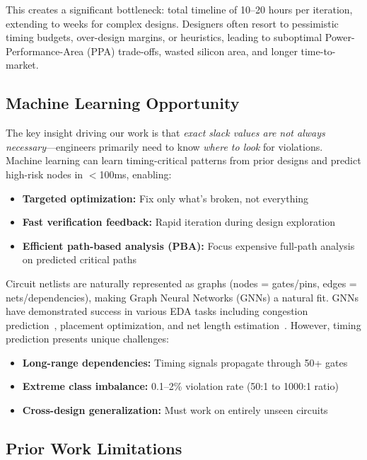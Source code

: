 \documentclass[10pt,twocolumn,journal]{IEEEtran}
\begin{document}
This creates a significant bottleneck: total timeline of 10--20 hours per iteration, extending to weeks for complex designs. Designers often resort to pessimistic timing budgets, over-design margins, or heuristics, leading to suboptimal Power-Performance-Area (PPA) trade-offs, wasted silicon area, and longer time-to-market.

\subsection{Machine Learning Opportunity}

The key insight driving our work is that \textit{exact slack values are not always necessary}---engineers primarily need to know \textit{where to look} for violations. Machine learning can learn timing-critical patterns from prior designs and predict high-risk nodes in $<$100ms, enabling:
\begin{itemize}
    \item \textbf{Targeted optimization:} Fix only what's broken, not everything
    \item \textbf{Fast verification feedback:} Rapid iteration during design exploration
    \item \textbf{Efficient path-based analysis (PBA):} Focus expensive full-path analysis on predicted critical paths
\end{itemize}

Circuit netlists are naturally represented as graphs (nodes = gates/pins, edges = nets/dependencies), making Graph Neural Networks (GNNs) a natural fit. GNNs have demonstrated success in various EDA tasks including congestion prediction~\cite{kirby2019congestionnet}, placement optimization, and net length estimation~\cite{xie2021net2}. However, timing prediction presents unique challenges:
\begin{itemize}
    \item \textbf{Long-range dependencies:} Timing signals propagate through 50+ gates
    \item \textbf{Extreme class imbalance:} 0.1--2\% violation rate (50:1 to 1000:1 ratio)
    \item \textbf{Cross-design generalization:} Must work on entirely unseen circuits
\end{itemize}

\subsection{Prior Work Limitations}
\end{document}
